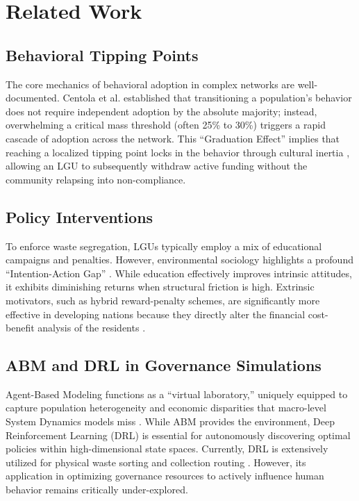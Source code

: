 \documentclass[conference,a4paper]{IEEEtran}
\begin{document}
\section{Related Work}

\subsection{Behavioral Tipping Points}
The core mechanics of behavioral adoption in complex networks are well-documented. Centola et al. \cite{centola2018} established that transitioning a population's behavior does not require independent adoption by the absolute majority; instead, overwhelming a critical mass threshold (often 25\% to 30\%) triggers a rapid cascade of adoption across the network. This ``Graduation Effect'' implies that reaching a localized tipping point locks in the behavior through cultural inertia \cite{andre2021}, allowing an LGU to subsequently withdraw active funding without the community relapsing into non-compliance.

\subsection{Policy Interventions}
To enforce waste segregation, LGUs typically employ a mix of educational campaigns and penalties. However, environmental sociology highlights a profound ``Intention-Action Gap'' \cite{paigalan2025}. While education effectively improves intrinsic attitudes, it exhibits diminishing returns when structural friction is high. Extrinsic motivators, such as hybrid reward-penalty schemes, are significantly more effective in developing nations because they directly alter the financial cost-benefit analysis of the residents \cite{zhao2022}.

\subsection{ABM and DRL in Governance Simulations}
Agent-Based Modeling functions as a ``virtual laboratory,'' uniquely equipped to capture population heterogeneity and economic disparities that macro-level System Dynamics models miss \cite{taraghi2025}. While ABM provides the environment, Deep Reinforcement Learning (DRL) is essential for autonomously discovering optimal policies within high-dimensional state spaces. Currently, DRL is extensively utilized for physical waste sorting and collection routing \cite{zheng2022b}. However, its application in optimizing governance resources to actively influence human behavior remains critically under-explored. 
\end{document}

